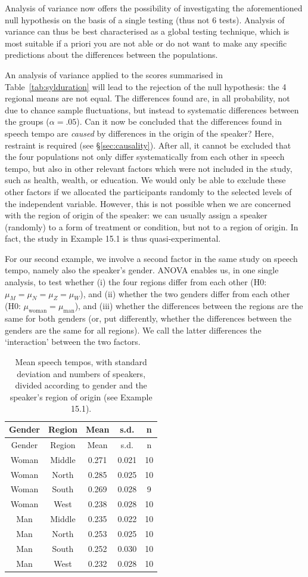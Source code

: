 \documentclass[
]{book}
\begin{document}
Analysis of variance now offers the possibility of investigating the
aforementioned null hypothesis on the basis of
a single testing (thus not 6 tests). Analysis of variance can thus be best
characterised as a global testing technique, which is most suitable
if a priori you are not able or do not want to make any specific predictions
about the differences between the populations.

An analysis of variance applied to the scores summarised in
Table~\ref{tab:sylduration}
will lead to the rejection of the null hypothesis: the 4 regional
means are not equal. The differences found are, in all probability, not due to
chance sample fluctuations, but instead to systematic differences between
the groups (\(\alpha=.05\)). Can it now be concluded that the differences
found in speech tempo are \emph{caused} by differences in the origin of the
speaker? Here, restraint is required (see
§\ref{sec:causality}). After all, it cannot be excluded that
the four populations not only differ systematically from each other in speech
tempo, but also in other relevant factors which were not included in the study,
such as health, wealth, or education. We would only be able to exclude these other
factors if we allocated the participants randomly to the selected levels of the
independent variable. However, this is not possible when we are concerned with the
region of origin of the speaker: we can usually assign a speaker (randomly)
to a form of treatment or condition, but not to a region of origin. In fact,
the study in Example 15.1 is thus quasi-experimental.

For our second example, we involve a second factor in the same study
on speech tempo, namely also the speaker's gender.
ANOVA enables us, in one single analysis, to test whether (i) the four
regions differ from each other (H0: \(\mu_M = \mu_N = \mu_Z = \mu_W\)), and
(ii) whether the two genders differ from each other (H0:
\(\mu_\textrm{woman} = \mu_\textrm{man}\)), and (iii) whether the differences
between the regions are the same for both genders (or, put differently, whether
the differences between the genders are the same for all
regions). We call the latter differences the `interaction' between the two factors.

\begin{longtable}[]{@{}ccccc@{}}
\caption{\label{tab:sylduration2way} Mean speech tempos, with standard deviation and
numbers of speakers, divided according to gender and the speaker's region of origin
(see Example 15.1).}\tabularnewline
\toprule
Gender & Region & Mean & s.d. & n\tabularnewline
\midrule
\endfirsthead
\toprule
Gender & Region & Mean & s.d. & n\tabularnewline
\midrule
\endhead
Woman & Middle & 0.271 & 0.021 & 10\tabularnewline
Woman & North & 0.285 & 0.025 & 10\tabularnewline
Woman & South & 0.269 & 0.028 & 9\tabularnewline
Woman & West & 0.238 & 0.028 & 10\tabularnewline
Man & Middle & 0.235 & 0.022 & 10\tabularnewline
Man & North & 0.253 & 0.025 & 10\tabularnewline
Man & South & 0.252 & 0.030 & 10\tabularnewline
Man & West & 0.232 & 0.028 & 10\tabularnewline
\bottomrule
\end{longtable}
\end{document}
